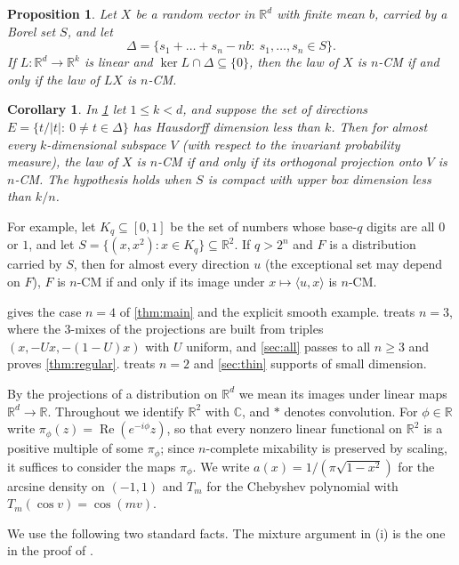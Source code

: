 \documentclass[11pt]{article}
\newtheorem{proposition}[theorem]{Proposition}
\newtheorem{corollary}[theorem]{Corollary}
\theoremstyle{definition}
\theoremstyle{remark}
\newcommand{\R}{\mathbb{R}}
\newcommand{\C}{\mathbb{C}}
\DeclareMathOperator{\re}{Re}
\begin{document}
\begin{proposition}\label{prop:thin}
Let $X$ be a random vector in $\R^d$ with finite mean $b$, carried by a Borel set $S$, and let
\[
\Delta=\{s_1+\dots+s_n-nb:\ s_1,\dots,s_n\in S\}.
\]
If $L\colon\R^d\to\R^k$ is linear and $\ker L\cap \Delta\subseteq\{0\}$, then the law of $X$ is $n$-CM if and only if the
law of $LX$ is $n$-CM.
\end{proposition}

\begin{corollary}\label{cor:dim}
In \cref{prop:thin} let $1\le k<d$, and suppose the set of directions $E=\{t/|t|:\ 0\ne t\in \Delta\}$ has Hausdorff
dimension less than $k$. Then for almost every $k$-dimensional subspace $V$ (with respect to the invariant
probability measure), the law of $X$ is $n$-CM if and only if its orthogonal projection onto $V$ is $n$-CM. The
hypothesis holds when $S$ is compact with upper box dimension less than $k/n$.
\end{corollary}

For example, let $K_q\subseteq[0,1]$ be the set of numbers whose base-$q$ digits are all $0$ or $1$, and let
$S=\{(x,x^2):x\in K_q\}\subseteq\R^2$. If $q>2^n$ and $F$ is a distribution carried by $S$, then for almost every direction $u$
(the exceptional set may depend on $F$), $F$ is $n$-CM if and only if its image under $x\mapsto\langle u,x\rangle$ is
$n$-CM.

 gives the case $n=4$ of \cref{thm:main} and
the explicit smooth example.  treats $n=3$, where the $3$-mixes of the projections are built from
triples $(x,-Ux,-(1-U)x)$ with $U$ uniform, and
\cref{sec:all} passes to all $n\ge 3$ and proves \cref{thm:regular}.  treats $n=2$ and
\cref{sec:thin} supports of small dimension.

By the projections of a distribution on $\R^d$ we mean its images under linear maps $\R^d\to\R$.
Throughout we identify $\R^2$ with $\C$, and $*$ denotes convolution. For $\phi\in\R$ write $\pi_\phi(z)=\re(e^{-i\phi}z)$, so that every
nonzero linear functional on $\R^2$ is a positive multiple of some $\pi_\phi$; since $n$-complete mixability is
preserved by scaling, it suffices to consider the maps $\pi_\phi$. We write $a(x)=1/(\pi\sqrt{1-x^2})$ for the
arcsine density on $(-1,1)$ and $T_m$ for the Chebyshev polynomial with $T_m(\cos v)=\cos(mv)$.

We use the following two standard facts. The mixture argument in (i) is the one in the proof of
\cite[Theorem~2]{Wang}.
\end{document}
